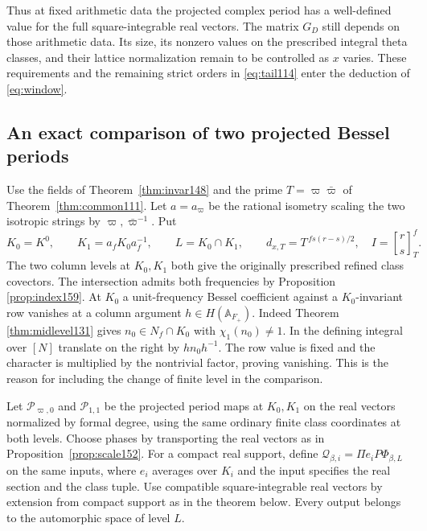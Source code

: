 \documentclass[a4paper,11pt]{article}
\theoremstyle{definition}
\theoremstyle{remark}
\numberwithin{equation}{section}
\begin{document}
Thus at fixed arithmetic data the projected complex period has
a well-defined value for the full square-integrable real
vectors. The matrix \(G_D\) still depends on those arithmetic
data. Its size, its nonzero values on the prescribed integral
theta classes, and their lattice normalization remain to be
controlled as \(x\) varies. These requirements and the
remaining strict orders in \eqref{eq:tail114} enter the
deduction of \eqref{eq:window}.

\subsection{An exact comparison of two projected Bessel periods}\label{nav:VII-27}
Use the fields of Theorem~\ref{thm:invar148} and the prime
\(T=\varpi\bar\varpi\) of Theorem~\ref{thm:common111}.
Let \(a=a_\varpi\) be the rational isometry scaling the two
isotropic strings by \(\varpi,\bar\varpi^{-1}\). Put
\[
   K_0=K^0,\qquad K_1=a_fK_0a_f^{-1},\qquad L=K_0\cap K_1,
       \qquad d_{x,T}=T^{\,fs(r-s)/2},\quad I={r\brack s}_T^f .
\]
The two column levels at \(K_0,K_1\) both give the originally
prescribed refined class covectors. The intersection admits both
frequencies by Proposition \ref{prop:index159}. At \(K_0\) a unit-frequency Bessel
coefficient against a \(K_0\)-invariant row vanishes at a
column argument \(h\in H(\mathbb A_{F_+})\). Indeed Theorem \ref{thm:midlevel131} gives \(n_0\in N_f\cap K_0\) with
\(\chi_1(n_0)\ne1\). In the defining integral over \([N]\)
translate on the right by \(hn_0h^{-1}\). The row value
is fixed and the character is multiplied by the nontrivial
factor, proving vanishing. This is the reason for including
the change of finite level in the comparison.

Let \(\mathcal P_{\varpi,0}\) and \(\mathcal P_{1,1}\) be the
projected period maps at \(K_0,K_1\) on the real vectors
normalized by formal degree, using the same ordinary finite
class coordinates at both levels. Choose phases by transporting
the real vectors as in Proposition~\ref{prop:scale152}.
For a compact real support, define
\(\mathcal Q_{\beta,i}=\Pi e_i P\Phi_{\beta,L}\) on the
same inputs, where \(e_i\) averages over \(K_i\) and the
input specifies the real section and the class tuple. Use
compatible square-integrable real vectors by extension from
compact support as in the theorem below. Every output belongs
to the automorphic space of level \(L\).
\end{document}
